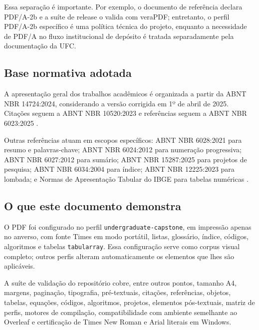 Essa separação é importante. Por exemplo, o documento de referência declara PDF/A-2b e a suíte de release o valida com veraPDF; entretanto, o perfil PDF/A-2b específico é uma política técnica do projeto, enquanto a necessidade de PDF/A no fluxo institucional de depósito é tratada separadamente pela documentação da UFC.

\subsection{Base normativa adotada}

A apresentação geral dos trabalhos acadêmicos é organizada a partir da ABNT NBR 14724:2024, considerando a versão corrigida em 1º de abril de 2025. Citações seguem a ABNT NBR 10520:2023 e referências seguem a ABNT NBR 6023:2025 \parencite{abnt14724,abnt10520,abnt6023}.

Outras referências atuam em escopos específicos: ABNT NBR 6028:2021 para resumo e palavras-chave; ABNT NBR 6024:2012 para numeração progressiva; ABNT NBR 6027:2012 para sumário; ABNT NBR 15287:2025 para projetos de pesquisa; ABNT NBR 6034:2004 para índice; ABNT NBR 12225:2023 para lombada; e Normas de Apresentação Tabular do IBGE para tabelas numéricas \parencite{abnt6028,abnt6024,abnt6027,abnt15287,abnt6034,abnt12225,ibge1993}.


\subsection{O que este documento demonstra}

O PDF foi configurado no perfil \texttt{undergraduate-capstone}, em impressão apenas no anverso, com fonte Times em modo portátil, listas, glossário, índice, códigos, algoritmos e tabelas \texttt{tabularray}. Essa configuração serve como corpus visual completo; outros perfis alteram automaticamente os elementos que lhes são aplicáveis.

A suíte de validação do repositório cobre, entre outros pontos, tamanho A4, margens, paginação, tipografia, pré-textuais, citações, referências, objetos, tabelas, equações, códigos, algoritmos, projetos, elementos pós-textuais, matriz de perfis, motores de compilação, compatibilidade com ambiente semelhante ao Overleaf e certificação de Times New Roman e Arial literais em Windows.


